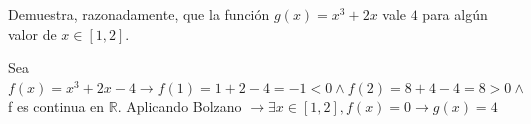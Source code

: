 \documentclass[addpoints,spanish, 12pt,a4paper]{exam}
\begin{document}
\begin{questions}



\addpoints

\question[4] Demuestra, razonadamente, que la función $g(x)=x^3+2x$ vale $4$ para algún valor de $x \in \left[1,2\right]$.
\begin{solution} Sea $f(x)=x^3+2x-4 \to f(1)=1+2-4=-1 <0 \land f(2)=8+4-4=8>0 \land $ f es continua en $\mathbb{R}$. Aplicando Bolzano  $\to \exists x \in \left[1,2 \right], f(x)=0 \to g(x)=4$\end{solution}




\end{questions}
\end{document}
